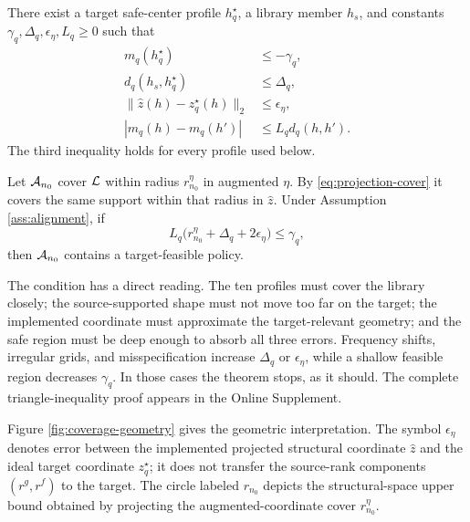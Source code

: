 \begin{assumption}\label{ass:alignment}
There exist a target safe-center profile $h_q^\star$, a library member $h_s$,
and constants $\gamma_q,\Delta_q,\epsilon_\eta,L_q\ge0$ such that
\begin{align*}
 m_q(h_q^\star)&\le-\gamma_q,\\
 d_q(h_s,h_q^\star)&\le\Delta_q,\\
 \|\widehat z(h)-z_q^\star(h)\|_2&\le\epsilon_\eta,\\
 |m_q(h)-m_q(h')|&\le L_q d_q(h,h').
\end{align*}
The third inequality holds for every profile used below.
\end{assumption}

\begin{theorem}\label{thm:aligned-coverage}
Let $\mathcal{A}_{n_0}$ cover $\mathcal{L}$ within radius $r_{n_0}^\eta$ in augmented $\eta$.
By \eqref{eq:projection-cover} it covers the same support within that radius in
$\widehat z$.  Under Assumption \ref{ass:alignment}, if
\begin{equation}\label{eq:coverage-condition}
 L_q\bigl(r_{n_0}^\eta+\Delta_q+2\epsilon_\eta\bigr)\le\gamma_q,
\end{equation}
then $\mathcal{A}_{n_0}$ contains a target-feasible policy.
\end{theorem}

The condition has a direct reading.  The ten profiles must cover the library
closely; the source-supported shape must not move too far on the target; the
implemented coordinate must approximate the target-relevant geometry; and the
safe region must be deep enough to absorb all three errors.  Frequency shifts,
irregular grids, and misspecification increase $\Delta_q$ or
$\epsilon_\eta$, while a shallow feasible region decreases $\gamma_q$.  In
those cases the theorem stops, as it should.  The complete triangle-inequality
proof appears in the Online Supplement.

Figure \ref{fig:coverage-geometry} gives the geometric interpretation.  The
symbol $\epsilon_\eta$ denotes error between the implemented projected
structural coordinate $\widehat z$ and the ideal target coordinate $z_q^\star$;
it does not transfer the source-rank components $(r^g,r^f)$ to the target.  The
circle labeled $r_{n_0}$ depicts the structural-space upper bound obtained by
projecting the augmented-coordinate cover $r_{n_0}^\eta$.

